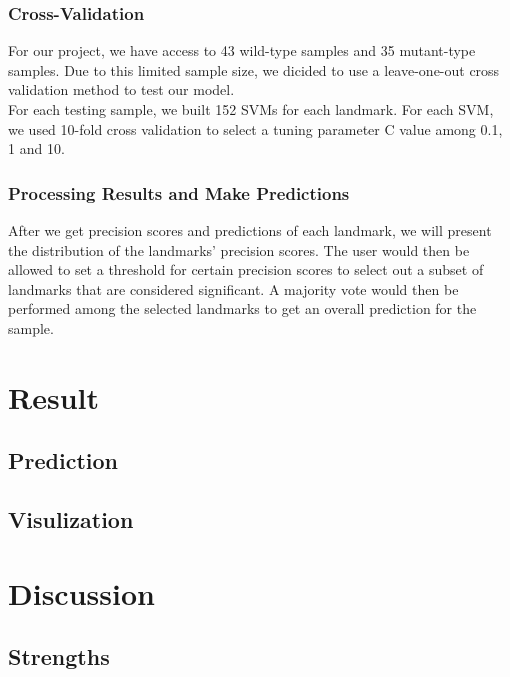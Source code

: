 \documentclass[10pt,letterpaper]{article}
\begin{document}
\subsubsection{Cross-Validation}\label{cross-validation}

For our project, we have access to 43 wild-type samples and 35
mutant-type samples. Due to this limited sample size, we dicided to use
a leave-one-out cross validation method to test our model.\\
For each testing sample, we built 152 SVMs for each landmark. For each
SVM, we used 10-fold cross validation to select a tuning parameter C
value among 0.1, 1 and 10.

\subsubsection{Processing Results and Make
Predictions}\label{processing-results-and-make-predictions}

After we get precision scores and predictions of each landmark, we will
present the distribution of the landmarks' precision scores. The user
would then be allowed to set a threshold for certain precision scores to
select out a subset of landmarks that are considered significant. A
majority vote would then be performed among the selected landmarks to
get an overall prediction for the sample.

\section{Result}\label{result}

\subsection{Prediction}\label{prediction}

\subsection{Visulization}\label{visulization}

\section{Discussion}\label{discussion}

\subsection{Strengths}\label{strengths}
\end{document}
